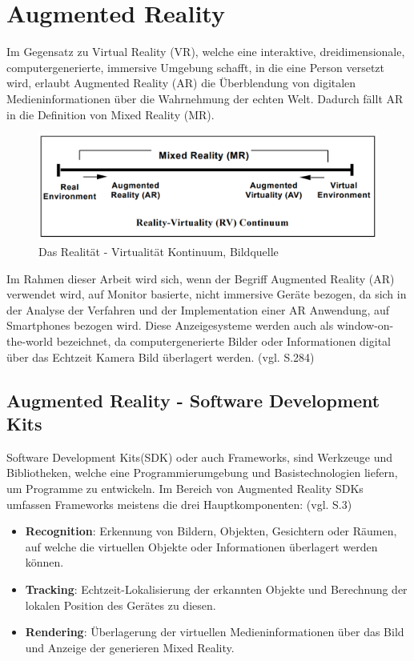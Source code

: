 \chapter{Augmented Reality}

Im Gegensatz zu \glqq Virtual Reality\grqq{} (VR), welche eine interaktive, dreidimensionale, computergenerierte, immersive Umgebung schafft, in die eine Person versetzt wird, erlaubt \glqq Augmented Reality\grqq{} (AR) die Überblendung von digitalen Medieninformationen über die Wahrnehmung der echten Welt. Dadurch fällt AR in die Definition von \glqq Mixed Reality\grqq{} (MR).

\begin{figure}[H]
	\centering
	\includegraphics[scale=0.52]{ar_vr.png}
	\caption{Das Realität - Virtualität Kontinuum, Bildquelle \cite{ar_vr}}
\end{figure} 

Im Rahmen dieser Arbeit wird sich, wenn der Begriff Augmented Reality (AR) verwendet wird, auf Monitor basierte, nicht immersive Geräte bezogen, da sich in der Analyse der Verfahren und der Implementation einer AR Anwendung, auf Smartphones bezogen wird. Diese Anzeigesysteme werden auch als \glqq window-on-the-world\grqq{} bezeichnet, da computergenerierte Bilder oder Informationen digital über das Echtzeit Kamera Bild überlagert werden. (vgl. \cite{ar_vr} S.284)



\section{Augmented Reality - Software Development Kits}

\glqq Software Development Kits\grqq (SDK) oder auch Frameworks, sind Werkzeuge und Bibliotheken, welche eine Programmierumgebung und Basistechnologien liefern, um Programme zu entwickeln. Im Bereich von Augmented Reality SDKs umfassen Frameworks meistens die drei Hauptkomponenten: (vgl. \cite{sdks} S.3)

\begin{itemize}

\item \textbf{Recognition}: Erkennung von Bildern, Objekten, Gesichtern oder Räumen, auf welche die virtuellen Objekte oder Informationen überlagert werden können.


\item \textbf{Tracking}: Echtzeit-Lokalisierung der erkannten Objekte und Berechnung der lokalen Position des Gerätes zu diesen.

\item \textbf{Rendering}: Überlagerung der virtuellen Medieninformationen über das Bild und Anzeige der generieren Mixed Reality.
\end{itemize}

